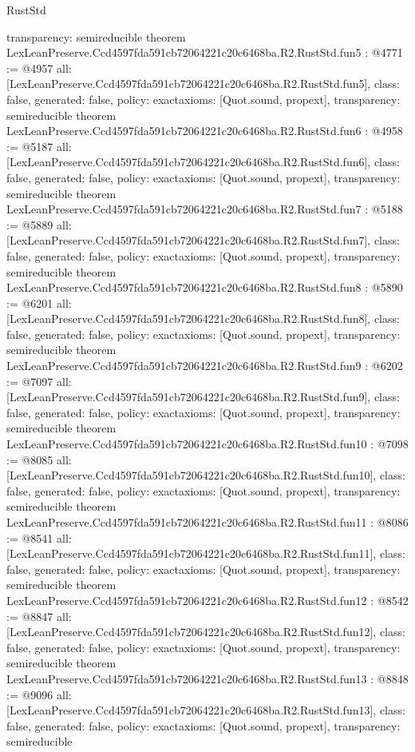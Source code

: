 \begin{lexlean}{RustStd}
\begin{coremodule}
{  transparency: semireducible
}
theorem LexLeanPreserve.Ccd4597fda591cb72064221c20c6468ba.R2.RustStd.fun5 : @4771 := @4957 {
  all: [LexLeanPreserve.Ccd4597fda591cb72064221c20c6468ba.R2.RustStd.fun5],
  class: false,
  generated: false,
  policy: exact{axioms: [Quot.sound, propext]},
  transparency: semireducible
}
theorem LexLeanPreserve.Ccd4597fda591cb72064221c20c6468ba.R2.RustStd.fun6 : @4958 := @5187 {
  all: [LexLeanPreserve.Ccd4597fda591cb72064221c20c6468ba.R2.RustStd.fun6],
  class: false,
  generated: false,
  policy: exact{axioms: [Quot.sound, propext]},
  transparency: semireducible
}
theorem LexLeanPreserve.Ccd4597fda591cb72064221c20c6468ba.R2.RustStd.fun7 : @5188 := @5889 {
  all: [LexLeanPreserve.Ccd4597fda591cb72064221c20c6468ba.R2.RustStd.fun7],
  class: false,
  generated: false,
  policy: exact{axioms: [Quot.sound, propext]},
  transparency: semireducible
}
theorem LexLeanPreserve.Ccd4597fda591cb72064221c20c6468ba.R2.RustStd.fun8 : @5890 := @6201 {
  all: [LexLeanPreserve.Ccd4597fda591cb72064221c20c6468ba.R2.RustStd.fun8],
  class: false,
  generated: false,
  policy: exact{axioms: [Quot.sound, propext]},
  transparency: semireducible
}
theorem LexLeanPreserve.Ccd4597fda591cb72064221c20c6468ba.R2.RustStd.fun9 : @6202 := @7097 {
  all: [LexLeanPreserve.Ccd4597fda591cb72064221c20c6468ba.R2.RustStd.fun9],
  class: false,
  generated: false,
  policy: exact{axioms: [Quot.sound, propext]},
  transparency: semireducible
}
theorem LexLeanPreserve.Ccd4597fda591cb72064221c20c6468ba.R2.RustStd.fun10 : @7098 := @8085 {
  all: [LexLeanPreserve.Ccd4597fda591cb72064221c20c6468ba.R2.RustStd.fun10],
  class: false,
  generated: false,
  policy: exact{axioms: [Quot.sound, propext]},
  transparency: semireducible
}
theorem LexLeanPreserve.Ccd4597fda591cb72064221c20c6468ba.R2.RustStd.fun11 : @8086 := @8541 {
  all: [LexLeanPreserve.Ccd4597fda591cb72064221c20c6468ba.R2.RustStd.fun11],
  class: false,
  generated: false,
  policy: exact{axioms: [Quot.sound, propext]},
  transparency: semireducible
}
theorem LexLeanPreserve.Ccd4597fda591cb72064221c20c6468ba.R2.RustStd.fun12 : @8542 := @8847 {
  all: [LexLeanPreserve.Ccd4597fda591cb72064221c20c6468ba.R2.RustStd.fun12],
  class: false,
  generated: false,
  policy: exact{axioms: [Quot.sound, propext]},
  transparency: semireducible
}
theorem LexLeanPreserve.Ccd4597fda591cb72064221c20c6468ba.R2.RustStd.fun13 : @8848 := @9096 {
  all: [LexLeanPreserve.Ccd4597fda591cb72064221c20c6468ba.R2.RustStd.fun13],
  class: false,
  generated: false,
  policy: exact{axioms: [Quot.sound, propext]},
  transparency: semireducible
}
\end{coremodule}
\end{lexlean}
